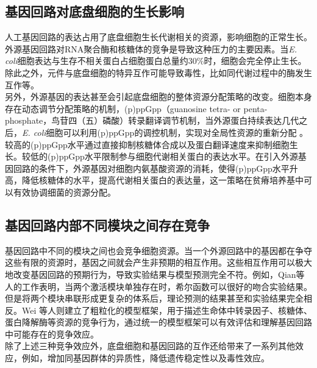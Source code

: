 \documentclass[b5paper,9pt,oneolumn,twoside,UTF8]{article}
\begin{document}
\subsection{基因回路对底盘细胞的生长影响} %
\indent 人工基因回路的表达占用了底盘细胞生长代谢相关的资源，影响细胞的正常生长\cite{10.1046/j.1365-2958.1996.5901313.x, 10.1093/nar/gkv1280}。外源基因回路对RNA聚合酶和核糖体\cite{Liu2018a}的竞争是导致这种压力的主要因素。当\emph{E. coli}细胞表达与生存不相关蛋白占细胞蛋白总量约30\%时，细胞会完全停止生长\cite{Vind1993, Scott2010}。除此之外，元件与底盘细胞的特异互作可能导致毒性，比如同代谢过程中的酶发生互作等。\\
\indent 另外，外源基因的表达甚至会引起底盘细胞的整体资源分配策略的改变。细胞本身存在动态调节分配策略的机制\cite{10.1016/j.molcel.2010.04.015, zhu2019growth, zhu2019ppGpp}，(p)ppGpp（guanosine tetra- or penta-phosphate，鸟苷四（五）磷酸）转录翻译调节机制，当外源蛋白持续表达几代之后，\emph{E. coli}细胞可以利用(p)ppGpp的调控机制，实现对全局性资源的重新分配 \cite{10.1016/j.molcel.2010.04.015,  10.1038/s41564-019-0543-1}。较高的(p)ppGpp水平通过直接抑制核糖体合成以及蛋白翻译速度来抑制细胞生长。较低的(p)ppGpp水平限制参与细胞代谢相关蛋白的表达水平。在引入外源基因回路的条件下，外源基因对细胞内氨基酸资源的消耗，使得(p)ppGpp水平升高，降低核糖体的水平，提高代谢相关蛋白的表达量，这一策略在贫瘠培养基中可以有效协调细菌的资源分配。
\subsection{基因回路内部不同模块之间存在竞争}
\indent 基因回路中不同的模块之间也会竞争细胞资源\cite{Cookson2011a, 10.1016/j.bpj.2015.06.034, Wei2019, 10.1093/nar/gkaa734}。当一个外源回路中的基因都在争夺这些有限的资源时，基因之间就会产生非预期的相互作用。这些相互作用可以极大地改变基因回路的预期行为，导致实验结果与模型预测完全不符。例如，Qian等人的工作表明，当两个激活模块单独存在时，希尔函数可以很好的吻合实验结果。但是将两个模块串联形成更复杂的体系后，理论预测的结果甚至和实验结果完全相反\cite{Qian2017}。Wei 等人则建立了粗粒化的模型框架，用于描述生命体中转录因子、核糖体、蛋白降解酶等资源的竞争行为，通过统一的模型框架可以有效评估和理解基因回路中可能存在的竞争效应\cite{Wei2019}。\\
\indent 除了上述三种竞争效应外，底盘细胞和基因回路的互作还给带来了一系列其他效应，例如，增加同基因群体的异质性，降低遗传稳定性以及毒性效应。%
\end{document}
